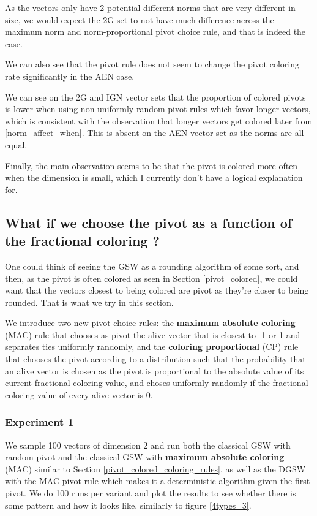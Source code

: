 \documentclass[12pt]{article}
\begin{document}
As the vectors only have 2 potential different norms that are very different in size, we would expect the 2G set to not have much difference across the maximum norm and norm-proportional pivot choice rule, and that is indeed the case.

We can also see that the pivot rule does not seem to change the pivot coloring rate significantly in the AEN case.

We can see on the 2G and IGN vector sets that the proportion of colored pivots is lower when using non-uniformly random pivot rules which favor longer vectors, which is consistent with the observation that longer vectors get colored later from \ref{norm_affect_when}. This is absent on the AEN vector set as the norms are all equal.

Finally, the main observation seems to be that the pivot is colored more often when the dimension is small, which I currently don't have a logical explanation for.

\subsection{What if we choose the pivot as a function of the fractional coloring ?}\label{pivot_coloring_rules}
One could think of seeing the GSW as a rounding algorithm of some sort, and then, as the pivot is often colored as seen in Section \ref{pivot_colored}, we could want that the vectors closest to being colored are pivot as they're closer to being rounded. That is what we try in this section.%

We introduce two new pivot choice rules: the \textbf{maximum absolute coloring} (MAC) rule that chooses as pivot the alive vector that is closest to -1 or 1 and separates ties uniformly randomly, and the \textbf{coloring proportional} (CP) rule that chooses the pivot according to a distribution such that the probability that an alive vector is chosen as the pivot is proportional to the absolute value of its current fractional coloring value, and choses uniformly randomly if the fractional coloring value of every alive vector is 0.

\subsubsection{Experiment 1}\label{exp_plot_max_col}
We sample 100 vectors of dimension 2 and run both the classical GSW with random pivot and the classical GSW with \textbf{maximum absolute coloring} (MAC) similar to Section \ref{pivot_colored_coloring_rules}, as well as the DGSW with the MAC pivot rule which makes it a deterministic algorithm given the first pivot. We do 100 runs per variant and plot the results to see whether there is some pattern and how it looks like, similarly to figure \ref{4types_3}.
\end{document}
